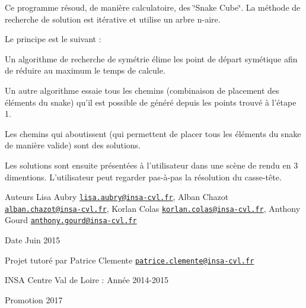 Ce programme résoud, de manière calculatoire, des \char`\"{}\-Snake Cube\char`\"{}. La méthode de recherche de solution est itérative et utilise un arbre n-\/aire.

Le principe est le suivant \-:
\begin{DoxyEnumerate}
\item Un algorithme de recherche de symétrie élime les point de départ symétique afin de réduire au maximum le temps de calcule.
\item Un autre algorithme essaie tous les chemins (combinaison de placement des éléments du snake) qu'il est possible de généré depuis les points trouvé à l'étape 1.
\item Les chemins qui aboutissent (qui permettent de placer tous les éléments du snake de manière valide) sont des solutions.
\item Les solutions sont ensuite présentées à l'utilisateur dans une scène de rendu en 3 dimentions. L'utilisateur peut regarder pas-\/à-\/pas la résolution du casse-\/tête.
\end{DoxyEnumerate}

\begin{DoxyAuthor}{Auteurs}
Lisa Aubry \href{mailto:lisa.aubry@insa-cvl.fr}{\tt lisa.\-aubry@insa-\/cvl.\-fr}, Alban Chazot \href{mailto:alban.chazot@insa-cvl.fr}{\tt alban.\-chazot@insa-\/cvl.\-fr}, Korlan Colas \href{mailto:korlan.colas@insa-cvl.fr}{\tt korlan.\-colas@insa-\/cvl.\-fr}, Anthony Gourd \href{mailto:anthony.gourd@insa-cvl.fr}{\tt anthony.\-gourd@insa-\/cvl.\-fr} 
\end{DoxyAuthor}
\begin{DoxyDate}{Date}
Juin 2015
\end{DoxyDate}
Projet tutoré par Patrice Clemente \href{mailto:patrice.clemente@insa-cvl.fr}{\tt patrice.\-clemente@insa-\/cvl.\-fr}

I\-N\-S\-A Centre Val de Loire \-: Année 2014-\/2015

Promotion 2017 